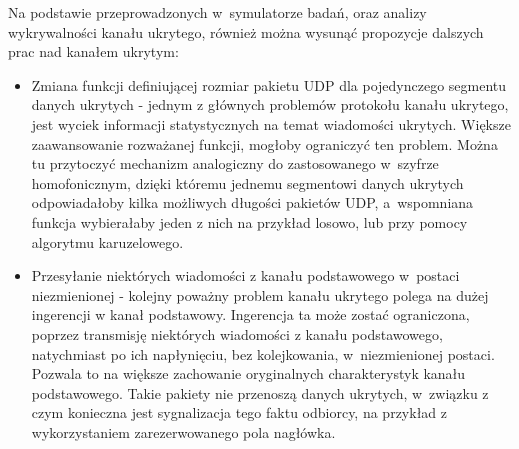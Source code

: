 \documentclass[a4paper, twoside, 12pt]{report}
\begin{document}
    Na podstawie przeprowadzonych w~symulatorze badań, oraz analizy wykrywalności
    kanału ukrytego, również można wysunąć propozycje dalszych prac nad kanałem ukrytym:

    \begin{itemize}
        \item Zmiana funkcji definiującej rozmiar pakietu UDP dla pojedynczego segmentu danych ukrytych -
            jednym z głównych problemów protokołu kanału ukrytego, jest wyciek
            informacji statystycznych na temat wiadomości ukrytych.
            Większe zaawansowanie rozważanej funkcji, mogłoby ograniczyć ten problem.
            Można tu przytoczyć mechanizm analogiczny do zastosowanego w~szyfrze
            homofonicznym, dzięki któremu jednemu segmentowi danych ukrytych
            odpowiadałoby kilka możliwych długości pakietów UDP, a~wspomniana funkcja
            wybierałaby jeden z nich na przykład losowo, lub przy pomocy algorytmu
            karuzelowego.
        \item Przesyłanie niektórych wiadomości z kanału podstawowego w~postaci niezmienionej -
            kolejny poważny problem kanału ukrytego polega na dużej ingerencji w
            kanał podstawowy. Ingerencja ta może zostać ograniczona, poprzez
            transmisję niektórych wiadomości z kanału podstawowego, natychmiast
            po ich napłynięciu, bez kolejkowania, w~niezmienionej postaci.
            Pozwala to na większe zachowanie oryginalnych charakterystyk kanału
            podstawowego. Takie pakiety nie przenoszą danych ukrytych, w~związku
            z czym konieczna jest sygnalizacja tego faktu odbiorcy, na przykład
            z wykorzystaniem zarezerwowanego pola nagłówka.
    \end{itemize}

\clearpage
{}


\end{document}
